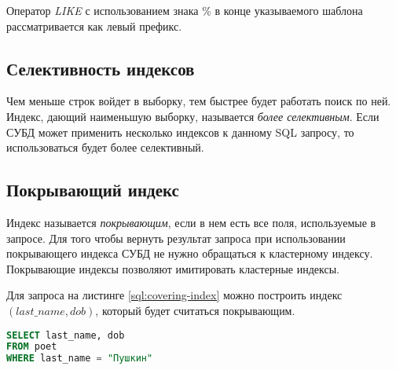Оператор \textit{LIKE} с использованием знака \% в конце указываемого шаблона рассматривается как левый префикс.

\subsection{Селективность индексов}

Чем меньше строк войдет в выборку, тем быстрее будет работать поиск по ней. Индекс, дающий наименьшую выборку, называется \textit{более селективным}. Если СУБД может применить несколько индексов к данному SQL запросу, то использоваться будет более селективный.

\subsection{Покрывающий индекс}
\label{section:covering-index}

Индекс называется \textit{покрывающим}, если в нем есть все поля, используемые в запросе. Для того чтобы вернуть результат запроса при использовании покрывающего индекса СУБД не нужно обращаться к кластерному индексу. Покрывающие индексы позволяют имитировать кластерные индексы. 

Для запроса на листинге \ref{sql:covering-index} можно построить индекс $(last\_name, dob)$, который будет считаться покрывающим.
\begin{lstlisting}[language=sql, label=sql:covering-index, caption={запрос для covering-index}]
SELECT last_name, dob
FROM poet
WHERE last_name = "Пушкин"
\end{lstlisting}
